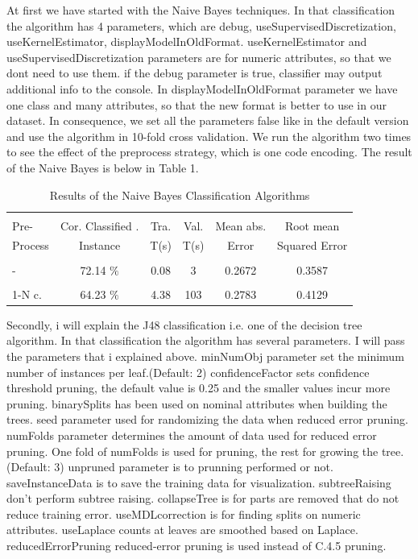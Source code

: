 \documentclass[a4paper]{article}
\begin{document}
At first we have started with the Naive Bayes techniques. In that
classification the algorithm has 4 parameters, which are debug,
useSupervisedDiscretization, useKernelEstimator, displayModelInOldFormat.
useKernelEstimator and useSupervisedDiscretization parameters are for numeric
attributes, so that we dont need to use them. if the debug parameter is true,
classifier may output additional info to the console. In
displayModelInOldFormat parameter we have one class and many attributes, so
that the new format is better to use in our dataset. In consequence, we set all
the parameters false like in the default version and use the algorithm in
10-fold cross validation. We run the algorithm two times to see the effect of
the preprocess strategy, which is one code encoding. The result of the Naive
Bayes is below in Table 1.

\begin{table}
\begin{tabular}{|l| c | c | c |c |c |}

\hline & & & & & \\
Pre- & Cor. Classified . & Tra. & Val. & Mean abs.  & Root mean \\
Process & Instance & T(s) &  T(s) & Error & Squared Error \\
\hline & & & & & \\
- &72.14  $\%$ & 0.08 & 3 &  0.2672 & 0.3587 \\ 
\hline & & & & & \\
1-N c. &64.23  $\%$ & 4.38 & 103 & 0.2783 & 0.4129 \\ 
\hline
\end{tabular}
\caption{Results of the Naive Bayes Classification Algorithms}
\end{table}

Secondly, i will explain the J48 classification i.e. one of the decision tree
algorithm. In that classification the algorithm has several parameters. I will
pass the parameters that i explained above. minNumObj parameter set the minimum
number of instances per leaf.(Default: 2) confidenceFactor sets confidence
threshold pruning, the default value is 0.25 and the smaller values incur more
pruning. binarySplits has been used on nominal attributes when building the
trees. seed parameter used for randomizing the data when reduced error pruning.
numFolds parameter determines the amount of data used for reduced error
pruning.  One fold of numFolds is used for pruning, the rest for growing the
tree. (Default: 3) unpruned parameter is to prunning performed or not.
saveInstanceData is to save the training data for visualization. subtreeRaising
don't perform subtree raising. collapseTree is for parts are removed that do
not reduce training error. useMDLcorrection is for finding splits on numeric
attributes. useLaplace counts at leaves are smoothed based on Laplace.
reducedErrorPruning reduced-error pruning is used instead of C.4.5 pruning. 
\end{document}
